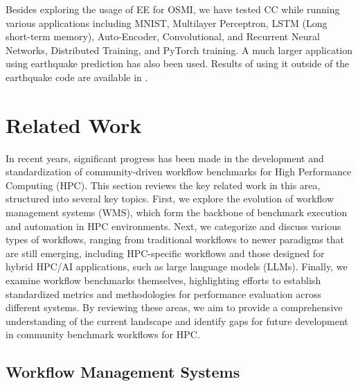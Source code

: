 \documentclass[sigconf]{acmart}
\begin{document}
Besides exploring the usage of EE for OSMI, we have tested CC while running various applications including MNIST, Multilayer Perceptron, LSTM (Long short-term memory), Auto-Encoder, Convolutional, and Recurrent Neural Networks, Distributed Training, and PyTorch training.  A much larger application using earthquake prediction has also been used. Results of using it outside of the earthquake code are available in \cite{las-2023-escience}.

%
%
%
%
%
%

\section{Related Work}
\label{sec:related}

In recent years, significant progress has been made in the development and standardization of community-driven workflow benchmarks for High Performance Computing (HPC). This section reviews the key related work in this area, structured into several key topics. First, we explore the evolution of workflow management systems (WMS), which form the backbone of benchmark execution and automation in HPC environments. Next, we categorize and discuss various types of workflows, ranging from traditional workflows to newer paradigms that are still emerging, including HPC-specific workflows and those designed for hybrid HPC/AI applications, such as large language models (LLMs). Finally, we examine workflow benchmarks themselves, highlighting efforts to establish standardized metrics and methodologies for performance evaluation across different systems. By reviewing these areas, we aim to provide a comprehensive understanding of the current landscape and identify gaps for future development in community benchmark workflows for HPC.


\subsection{Workflow Management Systems}
\end{document}
